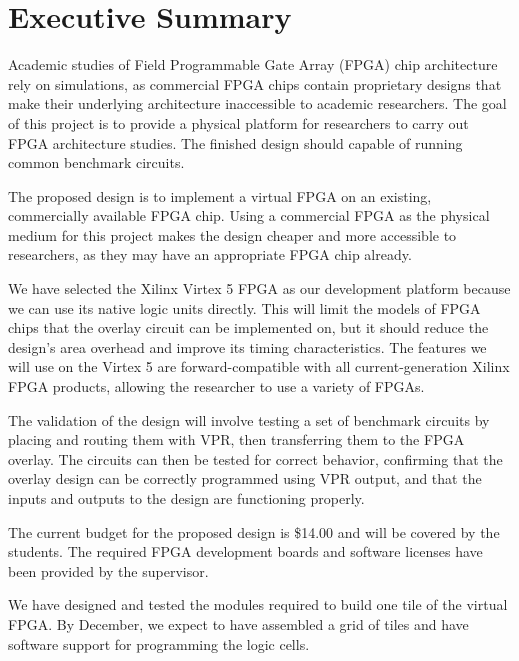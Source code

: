 \thispagestyle{empty}
\section*{Executive Summary}


Academic studies of Field Programmable Gate Array (FPGA) chip architecture rely on simulations, as commercial FPGA chips contain proprietary designs that make their underlying architecture inaccessible to academic researchers.
The goal of this project is to provide a physical platform for researchers to carry out FPGA architecture studies.
The finished design should capable of running common benchmark circuits.

The proposed design is to implement a virtual FPGA on an existing, commercially available FPGA chip.
Using a commercial FPGA as the physical medium for this project makes the design cheaper and more accessible to researchers, as they may have an appropriate FPGA chip already.


We have selected the Xilinx Virtex 5 FPGA as our development platform because we can use its native logic units directly.
This will limit the models of FPGA chips that the overlay circuit can be implemented on, but it should reduce the design's area overhead and improve its timing characteristics.
The features we will use on the Virtex 5 are forward-compatible with all current-generation Xilinx FPGA products, allowing the researcher to use a variety of FPGAs.

The validation of the design will involve testing a set of benchmark circuits by placing and routing them with VPR, then transferring them to the FPGA overlay.
The circuits can then be tested for correct behavior, confirming that the overlay design can be correctly programmed using VPR output, and that the inputs and outputs to the design are functioning properly.

The current budget for the proposed design is \$14.00 and will be covered by the students.
The required FPGA development boards and software licenses have been provided by the supervisor.

We have designed and tested the modules required to build one tile of the virtual FPGA.
By December, we expect to have assembled a grid of tiles and have software support for programming the logic cells.

